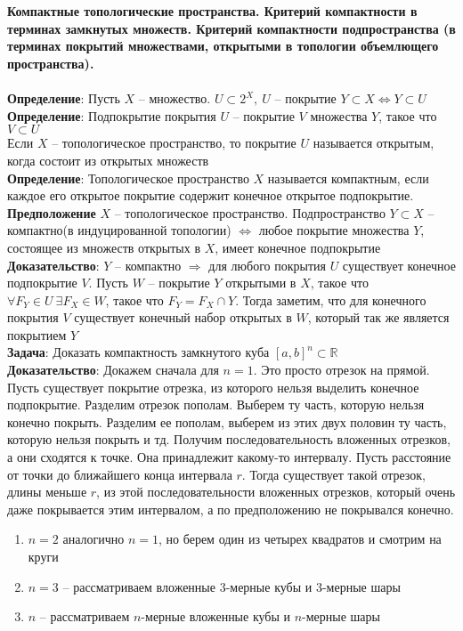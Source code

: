 \newpage
\section{}
	\textbf{Компактные топологические пространства. Критерий компактности в терминах замкнутых множеств. Критерий компактности подпространства (в терминах покрытий множествами, открытыми в топологии объемлющего пространства).}\\
	\\
	\textbf{Определение}: Пусть $X$ -- множество. $U \subset 2^{X},\ U$ -- покрытие $Y\subset X \Leftrightarrow Y \subset U$\\
	\textbf{Определение}: Подпокрытие покрытия $U$ -- покрытие $V$ множества $Y$, такое что $V\subset U$\\
	Если $X$ -- топологическое пространство, то покрытие $U$ называется открытым, когда состоит из открытых множеств\\
	\textbf{Определение}: Топологическое пространство $X$ называется компактным, если каждое его открытое покрытие содержит конечное открытое подпокрытие.\\
	\textbf{Предположение} $X$ -- топологическое пространство. Подпространство $Y \subset X$ -- компактно(в индуцированной топологии) $\Leftrightarrow$ любое покрытие множества $Y$, состоящее из множеств открытых в $X$, имеет конечное подпокрытие\\
	\textbf{Доказательство}: $Y$ -- компактно $\Rightarrow$ для любого покрытия $U$ существует конечное подпокрытие $V$. Пусть $W$ -- покрытие $Y$ открытыми в $X$, такое что $\forall F_{Y} \in U\ \exists F_{X} \in W$, такое что $F_{Y} = F_{X}\cap Y$. Тогда заметим, что для конечного покрытия $V$ существует конечный набор открытых в $W$, который так же является покрытием $Y$\\
	\textbf{Задача}: Доказать компактность замкнутого куба $[a,b]^n \subset \mathbb{R}$\\
	\textbf{Доказательство}: Докажем сначала для $n = 1$. Это просто отрезок на прямой. Пусть существует покрытие отрезка, из которого нельзя выделить конечное подпокрытие. Разделим отрезок пополам. Выберем ту часть, которую нельзя конечно покрыть. Разделим ее пополам, выберем из этих двух половин ту часть, которую нельзя покрыть и тд. Получим последовательность вложенных отрезков, а они сходятся к точке. Она принадлежит какому-то интервалу. Пусть расстояние от точки до ближайшего конца интервала $r$. Тогда существует такой отрезок, длины меньше $r$, из этой последовательности вложенных отрезков, который очень даже покрывается этим интервалом, а по предположению не покрывался конечно.\\
	\begin{enumerate}
		\item 
		$n = 2$ аналогично $n = 1$, но берем один из четырех квадратов и смотрим на круги
		\item 
		$n = 3$ -- рассматриваем вложенные 3-мерные кубы и 3-мерные шары
		\item 
		$n$ -- рассматриваем $n$-мерные вложенные кубы и $n$-мерные шары
	\end{enumerate}


